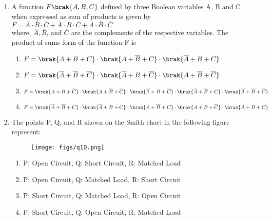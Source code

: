 \documentclass[a4paper, 11pt]{article}
\begin{document}
\begin{enumerate}
    \hfill{}

    \item A function $F\brak{A,B,C}$ defined by three Boolean variables A, B and C when expressed as sum of products is given by\\$F = \overline{A} \cdot \overline{B} \cdot \overline{C} + \overline{A} \cdot B \cdot \overline{C} + A \cdot \overline{B} \cdot \overline{C}$\\where, $\overline{A}, \overline{B}$, and $\overline{C}$ are the complements of the respective variables. The product of sums  form of the function F is
    \begin{enumerate}
        \item $F = \brak{A+B+C} \cdot \brak{A+\overline{B}+C} \cdot \brak{\overline{A}+B+C}$
        \item $F = \brak{\overline{A}+\overline{B}+\overline{C}} \cdot \brak{\overline{A}+B+\overline{C}} \cdot \brak{A+\overline{B}+\overline{C}}$
        \item $F = \brak{A+B+\overline{C}} \cdot \brak{A+\overline{B}+\overline{C}} \cdot \brak{\overline{A}+B+\overline{C}} \cdot \brak{\overline{A}+\overline{B}+C} \cdot \brak{\overline{A}+\overline{B}+\overline{C}}$
        \item $F = \brak{\overline{A}+\overline{B}+C} \cdot \brak{\overline{A}+B+C} \cdot \brak{A+\overline{B}+C} \cdot \brak{A+B+\overline{C}} \cdot \brak{A+B+C}$
    \end{enumerate}

    \hfill{}

    \item The points P, Q, and R shown on the Smith chart  in the following figure represent:
    \begin{figure}[H]
        \centering
        \texttt{[image: figs/q10.png]}
        \caption*{}
        \label{fig:q10}
    \end{figure}
    \begin{enumerate}
        \item P: Open Circuit, Q: Short Circuit, R: Matched Load
        \item P: Open Circuit, Q: Matched Load, R: Short Circuit
        \item P: Short Circuit, Q: Matched Load, R: Open Circuit
        \item P: Short Circuit, Q: Open Circuit, R: Matched Load
    \end{enumerate}


\end{enumerate}
\end{document}
